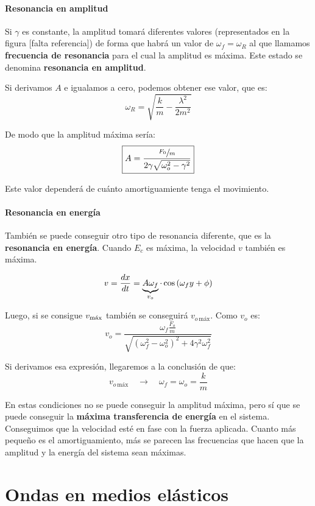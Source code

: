 \documentclass[a4paper]{book}
\begin{document}
\subsubsection{Resonancia en amplitud}
Si $\gamma$ es constante, la amplitud tomará diferentes valores (representados en la figura [falta referencia]) de forma que habrá un valor de $\omega_f = \omega_R$ al que llamamos \textbf{frecuencia de resonancia} para el cual la amplitud es máxima. Este estado se denomina \textbf{resonancia en amplitud}.

Si derivamos $A$ e igualamos a cero, podemos obtener ese valor, que es:
\[\boxed{\omega_R = \sqrt{\frac{k}{m}-\frac{\lambda^2}{2m^2}}}\]

De modo que la amplitud máxima sería:
\[\boxed{A = \frac{\sfrac{F_0}{m}}{2\gamma \sqrt{\omega_o^2-\gamma^2}}}\]

Este valor dependerá de cuánto amortiguamiente tenga el movimiento.

\subsubsection{Resonancia en energía}
También se puede conseguir otro tipo de resonancia diferente, que es la \textbf{resonancia en energía}. Cuando $E_c$ es máxima, la velocidad $v$ también es máxima.

\[v=\dv{x}{t} = \underbrace{A\omega_f}_{v_o}\cdot \cos\left( \omega_fy + \phi \right)\]

Luego, si se consigue $v_{\text{máx}}$ también se conseguirá
$v_{o\, \text{máx}}$. Como $v_o$ es:
\[v_o = \frac{\omega_f\frac{F_o}{m}}{\sqrt{\left( \omega_f^2-\omega_o^2 \right)^2+4\gamma^2\omega_f^2}}\]

Si derivamos esa expresión, llegaremos a la conclusión de que:
\[v_{o\,  \text{máx}}\quad \longrightarrow \quad \boxed{\omega_f=\omega_o = \frac{k}{m}}\]

En estas condiciones no se puede conseguir la amplitud máxima, pero sí que se puede conseguir la \textbf{máxima transferencia de energía} en el sistema. Conseguimos que la velocidad esté en fase con la fuerza aplicada. Cuanto más pequeño es el amortiguamiento, más se parecen las frecuencias que hacen que la amplitud y la energía del sistema sean máximas.



\chapter{Ondas en medios elásticos}
\end{document}
